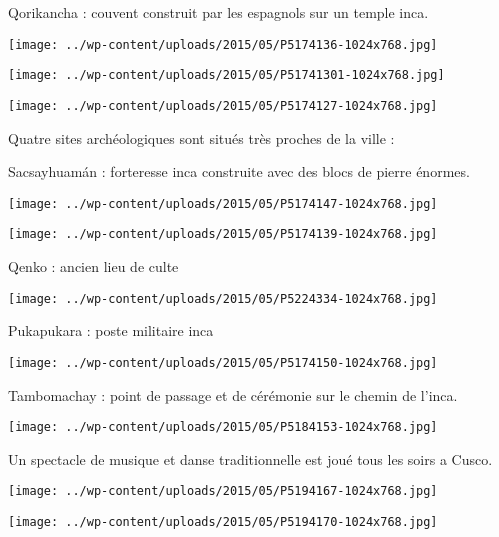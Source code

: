 Qorikancha : couvent construit par les espagnols sur un temple inca. 
\begin{center} \texttt{[image: ../wp-content/uploads/2015/05/P5174136-1024x768.jpg]} \end{center}
\begin{center} \texttt{[image: ../wp-content/uploads/2015/05/P51741301-1024x768.jpg]} \end{center}
\begin{center} \texttt{[image: ../wp-content/uploads/2015/05/P5174127-1024x768.jpg]} \end{center}
\pagebreak

Quatre sites archéologiques sont situés très proches de la ville : 

Sacsayhuamán : forteresse inca construite avec des blocs de pierre énormes. 
\begin{center} \texttt{[image: ../wp-content/uploads/2015/05/P5174147-1024x768.jpg]} \end{center}
\begin{center} \texttt{[image: ../wp-content/uploads/2015/05/P5174139-1024x768.jpg]} \end{center}
\pagebreak

Qenko : ancien lieu de culte 
\begin{center} \texttt{[image: ../wp-content/uploads/2015/05/P5224334-1024x768.jpg]} \end{center}

Pukapukara : poste militaire inca 
\begin{center} \texttt{[image: ../wp-content/uploads/2015/05/P5174150-1024x768.jpg]} \end{center}
\pagebreak

Tambomachay : point de passage et de cérémonie sur le chemin de l'inca. 
\begin{center} \texttt{[image: ../wp-content/uploads/2015/05/P5184153-1024x768.jpg]} \end{center}

Un spectacle de musique et danse traditionnelle est joué tous les soirs a Cusco. 
\begin{center} \texttt{[image: ../wp-content/uploads/2015/05/P5194167-1024x768.jpg]} \end{center}
\begin{center} \texttt{[image: ../wp-content/uploads/2015/05/P5194170-1024x768.jpg]} \end{center}

